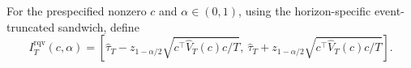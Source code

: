 For the prespecified nonzero \(c\) and \(\alpha\in(0,1)\), using the horizon-specific event-truncated sandwich, define
\[
 I_T^{\mathrm{rqv}}(c,\alpha)=
 \left[\widehat\tau_T-z_{1-\alpha/2}
 \sqrt{c^\top\widehat V_T(c)c/T},\ 
 \widehat\tau_T+z_{1-\alpha/2}
 \sqrt{c^\top\widehat V_T(c)c/T}\right].
\]